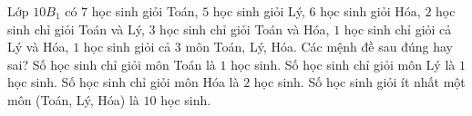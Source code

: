 \begin{ex}
Lớp $10B_1$ có $7$ học sinh giỏi Toán, $5$ học sinh giỏi Lý, $6$ học sinh giỏi Hóa, $2$ học sinh chỉ giỏi Toán và Lý, $3$ học sinh chỉ giỏi Toán và Hóa, $1$ học sinh chỉ giỏi cả Lý và Hóa, $1$ học sinh giỏi cả $3$ môn Toán, Lý, Hóa. Các mệnh đề sau đúng hay sai?
\choiceTF
{\True Số học sinh chỉ giỏi môn Toán là $1$ học sinh.}
{\True Số học sinh chỉ giỏi môn Lý là $1$ học sinh.}
{Số học sinh chỉ giỏi môn Hóa là $2$ học sinh.}
{\True Số học sinh giỏi ít nhất một môn (Toán, Lý, Hóa) là $10$ học sinh.}
\end{ex}
